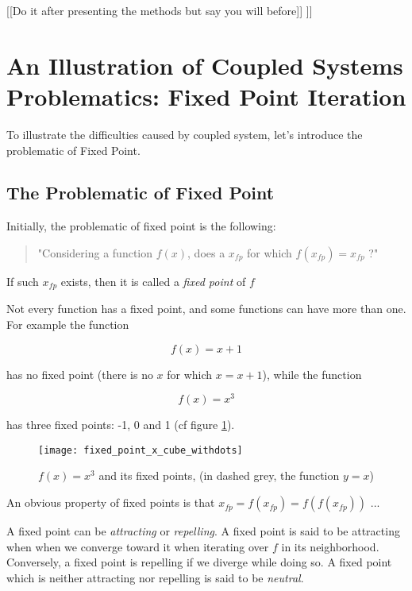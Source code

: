 [[Do it after presenting the methods but say you will before]]
]]

\section{An Illustration of Coupled Systems Problematics: Fixed Point Iteration}

To illustrate the difficulties caused by coupled system, let's introduce the problematic of Fixed Point.

\subsection{The Problematic of Fixed Point}

Initially, the problematic of fixed point is the following:

\begin{quote}"Considering a function $f(x)$, does a $x_{fp}$ for which $f(x_{fp}) = x_{fp}$ ?"\end{quote}

If such $x_{fp}$ exists, then it is called a \emph{fixed point} of $f$


Not every function has a fixed point, and some functions can have more than one. For example the function

$$f(x)=x+1$$

has no fixed point (there is no $x$ for which $x = x+1$), while the function

$$f(x) = x^3$$

has three fixed points: -1, 0 and 1 (cf figure \ref{fixed_points_x_3}).

\begin{figure}
\centering
\texttt{[image: fixed\_point\_x\_cube\_withdots]}
\caption{$f(x)=x^{3}$ and its fixed points, (in dashed grey, the function $y = x$)}
\label{fixed_points_x_3}
\end{figure}

An obvious property of fixed points is that $x_{fp} = f(x_{fp}) = f(f(x_{fp}))$ ...

A fixed point can be \emph{attracting} or \emph{repelling}. A fixed point is said to be attracting when when we converge toward it when iterating over $f$ in its neighborhood. Conversely, a fixed point is repelling if we diverge while doing so. A fixed point which is neither attracting nor repelling is said to be \emph{neutral}.

